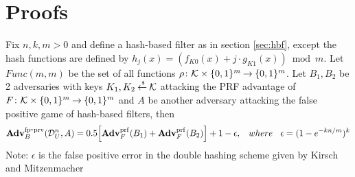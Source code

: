 \section{Proofs}
\begin{theorem}
Fix $n,k, m > 0$ and define a hash-based filter as in section \ref{sec:hbf}, except the hash functions are defined by $h_j(x) = \left( f_{K0}(x) + j\cdot g_{K1}(x)\right) \bmod m$. Let $Func(m,m)$ be the set of all functions $\rho \colon {\cal K} \times \{0,1\}^m {\:\stackrel{{\scriptscriptstyle \hspace{0.2em}}} {\rightarrow}\:} \{0,1\}^m$. Let $B_1, B_2$ be 2 adversaries with keys $K_1, K_2 {\:\stackrel{{\scriptscriptstyle \hspace{0.2em}\$}} {\leftarrow}\:} {\cal K}$ attacking the PRF advantage of $F \colon {\cal K} \times \{0,1\}^m {\:\stackrel{{\scriptscriptstyle \hspace{0.2em}}} {\rightarrow}\:} \{0,1\}^m$ and $A$ be another adversary attacking the false positive game of hash-based filters, then 
\begin{equation}
\mathrm{\mathbf{Adv}}^{\mathrm{fp\mbox{-}prv}}_{B}(\mathcal{D}_{U}^{n},A)  = 0.5\Big[\mathbf{Adv}^{\mathrm{prf}}_{F}(B_1) + \mathbf{Adv}^{\mathrm{prf}}_{F}(B_2)\Big] + 1-\epsilon, \hspace*{2ex} where \hspace*{2ex} \epsilon = (1-e^{-kn/m})^k
\end{equation}
Note: $\epsilon$ is the false positive error in the double hashing scheme given by Kirsch and Mitzenmacher \cite{xxx}
\end{theorem}

